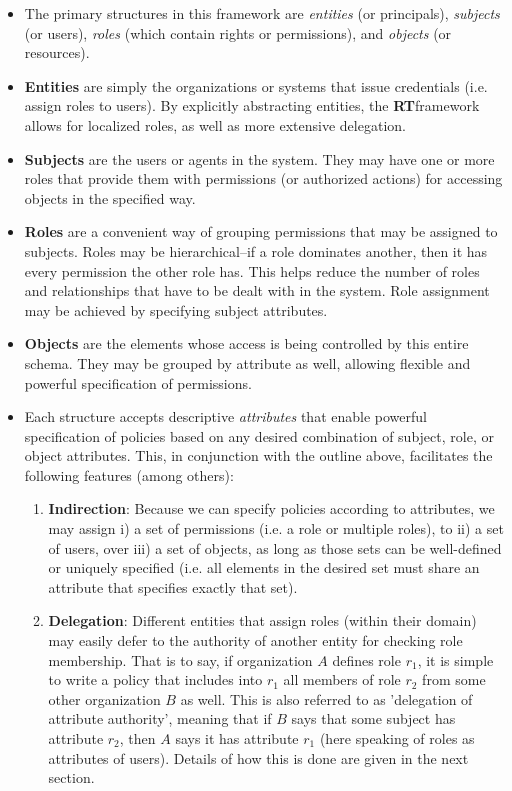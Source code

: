 \documentclass{article}
\providecommand{\RT}{\textbf{RT}}
\begin{document}
\begin{itemize}
  \item The primary structures in this framework are \textit{entities} (or principals), \textit{subjects} (or users), \textit{roles} (which contain rights or permissions), and \textit{objects} (or resources).
  \item \textbf{Entities} are simply the organizations or systems that issue credentials (i.e. assign roles to users). By explicitly abstracting entities, the \RT framework allows for localized roles, as well as more extensive delegation.
  \item \textbf{Subjects} are the users or agents in the system. They may have one or more roles that provide them with permissions (or authorized actions) for accessing objects in the specified way.
  \item \textbf{Roles} are a convenient way of grouping permissions that may be assigned to subjects. Roles may be hierarchical--if a role dominates another, then it has every permission the other role has. This helps reduce the number of roles and relationships that have to be dealt with in the system. Role assignment may be achieved by specifying subject attributes.
  \item \textbf{Objects} are the elements whose access is being controlled by this entire schema. They may be grouped by attribute as well, allowing flexible and powerful specification of permissions.
  \item Each structure accepts descriptive \textit{attributes} that enable powerful specification of policies based on any desired combination of subject, role, or object attributes. This, in conjunction with the outline above, facilitates the following features (among others): \\
  \begin{enumerate}
    \item \textbf{Indirection}: Because we can specify policies according to attributes, we may assign i) a set of permissions (i.e. a role or multiple roles), to ii) a set of users, over iii) a set of objects, as long as those sets can be well-defined or uniquely specified (i.e. all elements in the desired set must share an attribute that specifies exactly that set).
    \item \textbf{Delegation}: Different entities that assign roles (within their domain) may easily defer to the authority of another entity for checking role membership. That is to say, if organization $A$ defines role $r_1$, it is simple to write a policy that includes into $r_1$ all members of role $r_2$ from some other organization $B$ as well. This is also referred to as 'delegation of attribute authority', meaning that if $B$ says that some subject has attribute $r_2$, then $A$ says it has attribute $r_1$ (here speaking of roles as attributes of users). Details of how this is done are given in the next section.

\end{enumerate}
\end{itemize}
\end{document}
